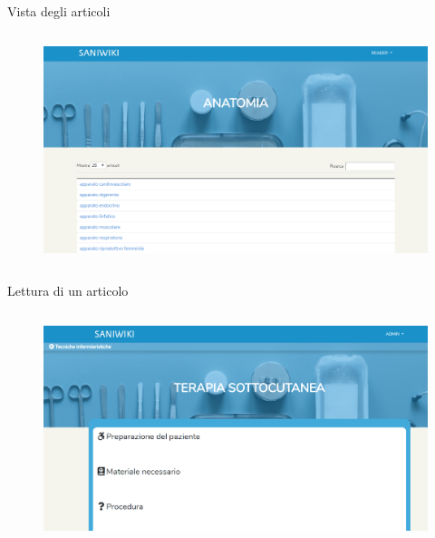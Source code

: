 \documentclass{beamer}
\begin{document}
\begin{frame}[plain]{Vista degli articoli}
\begin{columns}
	\begin{figure}[!h]
		\includegraphics[scale=0.37]{saniwiki_articoli.png}
	\end{figure}
\end{columns}
\end{frame}

\begin{frame}[plain]{Lettura di un articolo}
\begin{columns}
	\begin{figure}[!h]
		\includegraphics[scale=0.37]{saniwiki_sezioni.png}
	\end{figure}
\end{columns}
\end{frame}
\end{document}
